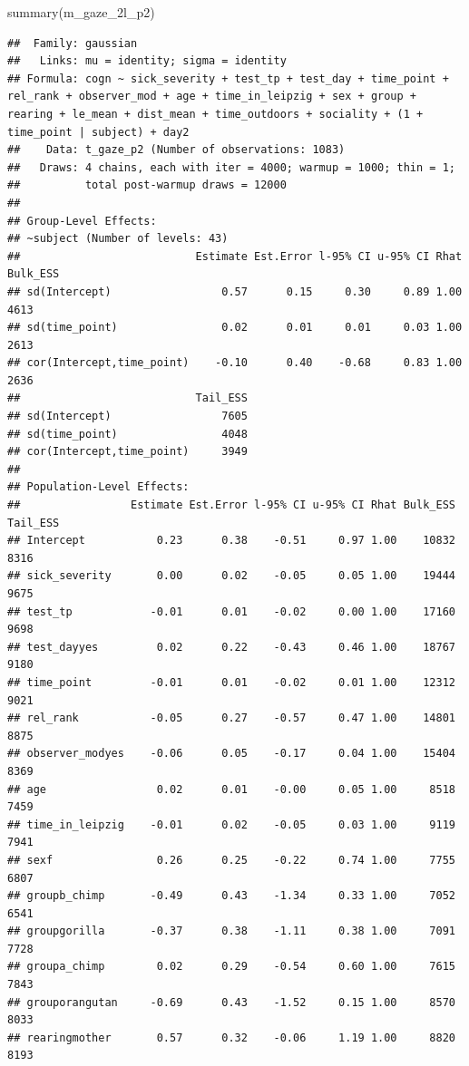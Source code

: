 \documentclass[
]{article}
\newenvironment{Shaded}{\begin{snugshade}}{\end{snugshade}}
\newcommand{\FunctionTok}[1]{\textcolor[rgb]{0.00,0.00,0.00}{#1}}
\newcommand{\NormalTok}[1]{#1}
\begin{document}
\begin{Shaded}
\begin{Highlighting}[]
\FunctionTok{summary}\NormalTok{(m\_gaze\_2l\_p2)}
\end{Highlighting}
\end{Shaded}

\begin{verbatim}
##  Family: gaussian 
##   Links: mu = identity; sigma = identity 
## Formula: cogn ~ sick_severity + test_tp + test_day + time_point + rel_rank + observer_mod + age + time_in_leipzig + sex + group + rearing + le_mean + dist_mean + time_outdoors + sociality + (1 + time_point | subject) + day2 
##    Data: t_gaze_p2 (Number of observations: 1083) 
##   Draws: 4 chains, each with iter = 4000; warmup = 1000; thin = 1;
##          total post-warmup draws = 12000
## 
## Group-Level Effects: 
## ~subject (Number of levels: 43) 
##                           Estimate Est.Error l-95% CI u-95% CI Rhat Bulk_ESS
## sd(Intercept)                 0.57      0.15     0.30     0.89 1.00     4613
## sd(time_point)                0.02      0.01     0.01     0.03 1.00     2613
## cor(Intercept,time_point)    -0.10      0.40    -0.68     0.83 1.00     2636
##                           Tail_ESS
## sd(Intercept)                 7605
## sd(time_point)                4048
## cor(Intercept,time_point)     3949
## 
## Population-Level Effects: 
##                 Estimate Est.Error l-95% CI u-95% CI Rhat Bulk_ESS Tail_ESS
## Intercept           0.23      0.38    -0.51     0.97 1.00    10832     8316
## sick_severity       0.00      0.02    -0.05     0.05 1.00    19444     9675
## test_tp            -0.01      0.01    -0.02     0.00 1.00    17160     9698
## test_dayyes         0.02      0.22    -0.43     0.46 1.00    18767     9180
## time_point         -0.01      0.01    -0.02     0.01 1.00    12312     9021
## rel_rank           -0.05      0.27    -0.57     0.47 1.00    14801     8875
## observer_modyes    -0.06      0.05    -0.17     0.04 1.00    15404     8369
## age                 0.02      0.01    -0.00     0.05 1.00     8518     7459
## time_in_leipzig    -0.01      0.02    -0.05     0.03 1.00     9119     7941
## sexf                0.26      0.25    -0.22     0.74 1.00     7755     6807
## groupb_chimp       -0.49      0.43    -1.34     0.33 1.00     7052     6541
## groupgorilla       -0.37      0.38    -1.11     0.38 1.00     7091     7728
## groupa_chimp        0.02      0.29    -0.54     0.60 1.00     7615     7843
## grouporangutan     -0.69      0.43    -1.52     0.15 1.00     8570     8033
## rearingmother       0.57      0.32    -0.06     1.19 1.00     8820     8193

\end{verbatim}
\end{document}
